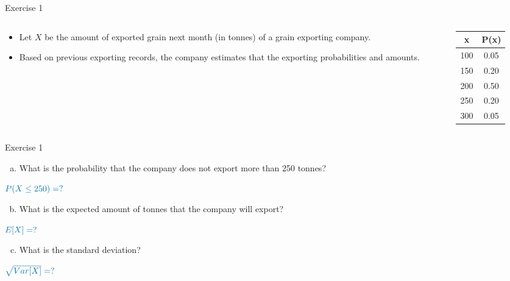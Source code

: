 \documentclass[
  11pt,
  ignorenonframetext,
]{beamer}
\providecommand{\tightlist}{%
  \setlength{\itemsep}{0pt}\setlength{\parskip}{0pt}}
\begin{document}
\begin{frame}{Exercise 1}
\protect\hypertarget{exercise-1}{}
\begin{columns}[T]
\begin{column}{.7\textwidth}
\begin{itemize}
\tightlist
\item
  Let \(X\) be the amount of exported grain next month (in tonnes) of a
  grain exporting company.
\end{itemize}

\vspace{3mm}

\begin{itemize}
\tightlist
\item
  Based on previous exporting records, the company estimates that the
  exporting probabilities and amounts.
\end{itemize}
\end{column}

\begin{column}{0.48\textwidth}
\begin{table}
\centering
\begin{tabular}{cc}
\hline
x & P(x) \tabularnewline
\hline
100 & 0.05 \tabularnewline
150 & 0.20 \tabularnewline
200 & 0.50 \tabularnewline
250 & 0.20 \tabularnewline
300 & 0.05 \tabularnewline
\hline
\end{tabular}
\end{table}
\end{column}
\end{columns}
\end{frame}

\begin{frame}{Exercise 1}
\protect\hypertarget{exercise-1-1}{}
\begin{enumerate}
[(a)]
\tightlist
\item
  What is the probability that the company does not export more than 250
  tonnes?
\end{enumerate}

\quad\quad \(\color{blue}{P(X \leq 250) = ?}\)

\begin{enumerate}
[(a)]
\setcounter{enumi}{1}
\tightlist
\item
  What is the expected amount of tonnes that the company will export?
\end{enumerate}

\quad\quad \(\color{blue}{E[X] = ?}\)

\begin{enumerate}
[(a)]
\setcounter{enumi}{2}
\tightlist
\item
  What is the standard deviation?
\end{enumerate}

\quad\quad \(\color{blue}{\sqrt{Var[X]} = ?}\)
\end{frame}
\end{document}
